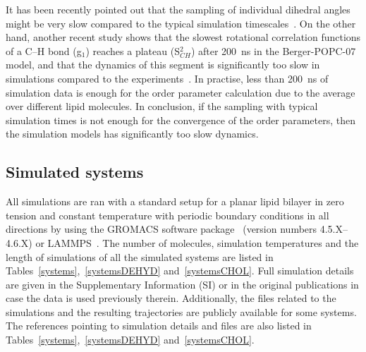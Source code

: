 \documentclass[pre,aps,floatfix,authordate1-4,twocolumn]{revtex4-1}
\begin{document}
It has been recently pointed out that the sampling of individual dihedral angles might be very
slow compared to the typical simulation timescales~\cite{vogel12}. On the other hand, another recent
study shows that the slowest rotational correlation functions of a C--H bond (g$_1$) reaches a plateau (S$_{CH}^2$)
after 200~ns in the Berger-POPC-07~\cite{ollila07a} model, and that the dynamics of this segment is significantly too slow in simulations
compared to the experiments~\cite{ferreira15}. In practise, less than 200~ns of simulation data is enough for the order parameter
calculation due to the average over different lipid molecules. In conclusion, if the sampling with typical simulation times
is not enough for the convergence of the order parameters, then the simulation models has significantly too slow dynamics.





\subsection{Simulated systems}
All simulations are ran with a standard setup for a planar lipid bilayer in zero tension and constant temperature
with periodic boundary conditions in all directions by using the GROMACS software package~\cite{hess08} 
(version numbers 4.5.X--4.6.X) or LAMMPS~\cite{plimpton95}.
The number of molecules, simulation temperatures and the length of simulations of all the simulated systems 
are listed in Tables~\ref{systems},~\ref{systemsDEHYD} and~\ref{systemsCHOL}. Full simulation
details are given in the Supplementary Information (SI) or in the original publications in case the
data is used previously therein. Additionally, the files related to the simulations and the resulting trajectories are publicly
available for some systems. The references pointing to simulation details and files are also listed in Tables~\ref{systems},~\ref{systemsDEHYD} and~\ref{systemsCHOL}.
\end{document}
